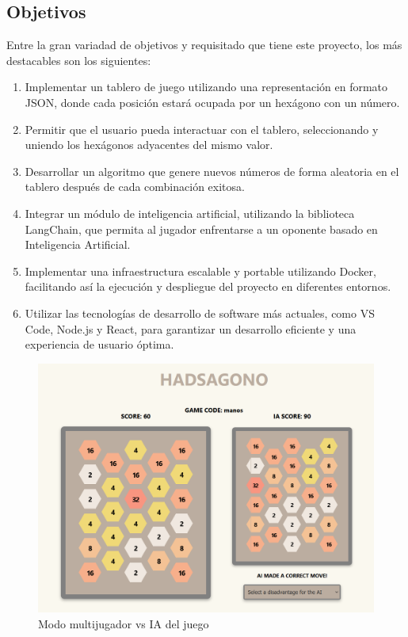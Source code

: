 \documentclass[12pt,epsf,titlepage,a4paper]{article}
\begin{document}
\subsection{Objetivos}
Entre la gran variadad de objetivos y requisitado que tiene este proyecto, los más destacables son los siguientes:
\begin{enumerate}
   
    \item Implementar un tablero de juego utilizando una representación en formato JSON, donde cada posición estará ocupada por un hexágono con un número.
    \item Permitir que el usuario pueda interactuar con el tablero, seleccionando y uniendo los hexágonos adyacentes del mismo valor.
    \item Desarrollar un algoritmo que genere nuevos números de forma aleatoria en el tablero después de cada combinación exitosa.
    \item Integrar un módulo de inteligencia artificial, utilizando la biblioteca LangChain, que permita al jugador enfrentarse a un oponente basado en Inteligencia Artificial.
    \item Implementar una infraestructura escalable y portable utilizando Docker, facilitando así la ejecución y despliegue del proyecto en diferentes entornos.
    \item Utilizar las tecnologías de desarrollo de software más actuales, como VS Code, Node.js y React, para garantizar un desarrollo eficiente y una experiencia de usuario óptima.    
    
\end{enumerate}



\begin{figure}[h]
  \centering
  \includegraphics[scale=0.30]{img/multi.png}
  \caption{Modo multijugador vs IA del juego}
  \label{fig:capturaaplicacion}
\end{figure}
\end{document}
